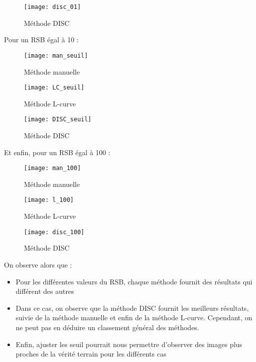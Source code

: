 \documentclass[12pt,a4paper,titlepage]{article}
\begin{document}
\begin{figure}[H]
    \caption{Méthode DISC}
    \label{brain}
    \texttt{[image: disc\_01]}
    \centering
\end{figure}

Pour un RSB égal à 10 :

\begin{figure}[H]
    \caption{Méthode manuelle}
    \label{brain}
    \texttt{[image: man\_seuil]}
    \centering
\end{figure}

\begin{figure}[H]
    \caption{Méthode L-curve}
    \label{brain}
    \texttt{[image: LC\_seuil]}
    \centering
\end{figure}

\begin{figure}[H]
    \caption{Méthode DISC}
    \label{brain}
    \texttt{[image: DISC\_seuil]}
    \centering
\end{figure}

Et enfin, pour un RSB égal à 100 :

\begin{figure}[H]
    \caption{Méthode manuelle}
    \label{brain}
    \texttt{[image: man\_100]}
    \centering
\end{figure}

\begin{figure}[H]
    \caption{Méthode L-curve}
    \label{brain}
    \texttt{[image: l\_100]}
    \centering
\end{figure}

\begin{figure}[H]
    \caption{Méthode DISC}
    \label{brain}
    \texttt{[image: disc\_100]}
    \centering
\end{figure}

On observe alors que :

\begin{itemize}
    \item{Pour les différentes valeurs du RSB, chaque méthode fournit des résultats
        qui différent des autres}
    \item{Dans ce cas, on observe que la méthode DISC fournit les meilleurs résultats,
        suivie de la méthode manuelle et enfin de la méthode L-curve. Cependant, on ne peut
        pas en déduire un classement général des méthodes.}
    \item{Enfin, ajuster les seuil pourrait nous permettre d'observer des images plus proches
        de la vérité terrain pour les différents cas}
\end{itemize}
\end{document}
